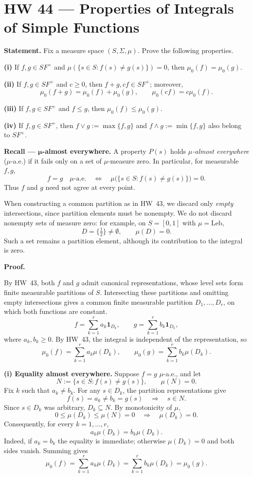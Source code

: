 \documentclass[10pt,a4paper]{article}
\begin{document}
\section*{\textcolor{PFFBlue}{HW 44 --- Properties of Integrals of Simple Functions}}

\textbf{Statement.} Fix a measure space $(S,\Sigma,\mu)$. Prove the following properties.

\textbf{(i)} If $f,g\in SF^+$ and $\mu(\{s\in S:f(s)\ne g(s)\})=0$, then $\mu_0(f)=\mu_0(g)$.

\textbf{(ii)} If $f,g\in SF^+$ and $c\ge0$, then $f+g,cf\in SF^+$; moreover,
\[
\mu_0(f+g)=\mu_0(f)+\mu_0(g),\qquad \mu_0(cf)=c\mu_0(f).
\]

\textbf{(iii)} If $f,g\in SF^+$ and $f\le g$, then $\mu_0(f)\le\mu_0(g)$.

\textbf{(iv)} If $f,g\in SF^+$, then $f\vee g:=\max\{f,g\}$ and $f\wedge g:=\min\{f,g\}$ also belong to $SF^+$.

\medskip
\textbf{Recall --- $\boldsymbol{\mu}$-almost everywhere.}
A property $P(s)$ holds \emph{$\mu$-almost everywhere} ($\mu$-a.e.) if it fails only on a set of $\mu$-measure zero. In particular, for measurable $f,g$,
\[
f=g\quad\mu\text{-a.e.}
\quad\Longleftrightarrow\quad
\mu\bigl(\{s\in S:f(s)\ne g(s)\}\bigr)=0.
\]
Thus $f$ and $g$ need not agree at every point.

When constructing a common partition as in HW~43, we discard only \emph{empty} intersections, since partition elements must be nonempty. We do not discard nonempty sets of measure zero: for example, on $S=[0,1]$ with $\mu=\mathrm{Leb}$,
\[
D=\{\tfrac12\}\ne\emptyset,\qquad \mu(D)=0.
\]
Such a set remains a partition element, although its contribution to the integral is zero.

\medskip
\textbf{\textcolor{PFFBlue}{Proof.}}

By HW~43, both $f$ and $g$ admit canonical representations, whose level sets form finite measurable partitions of $S$. Intersecting these partitions and omitting empty intersections gives a common finite measurable partition $D_1,\ldots,D_r$, on which both functions are constant.
\[
f=\sum_{k=1}^{r}a_k\mathbf1_{D_k},\qquad
 g=\sum_{k=1}^{r}b_k\mathbf1_{D_k},
\]
where $a_k,b_k\ge0$. By HW~43, the integral is independent of the representation, so
\[
\mu_0(f)=\sum_{k=1}^{r}a_k\mu(D_k),\qquad
\mu_0(g)=\sum_{k=1}^{r}b_k\mu(D_k).
\]

\textbf{(i) Equality almost everywhere.}
Suppose $f=g$ $\mu$-a.e., and let
\[
N:=\{s\in S:f(s)\ne g(s)\},\qquad \mu(N)=0.
\]
Fix $k$ such that $a_k\ne b_k$. For any $s\in D_k$, the partition representations give
\[
f(s)=a_k\ne b_k=g(s)\quad\Longrightarrow\quad s\in N.
\]
Since $s\in D_k$ was arbitrary, $D_k\subseteq N$. By monotonicity of $\mu$,
\[
0\le\mu(D_k)\le\mu(N)=0
\quad\Longrightarrow\quad \mu(D_k)=0.
\]
Consequently, for every $k=1,\ldots,r$,
\[
a_k\mu(D_k)=b_k\mu(D_k).
\]
Indeed, if $a_k=b_k$ the equality is immediate; otherwise $\mu(D_k)=0$ and both sides vanish. Summing gives
\[
\mu_0(f)=\sum_{k=1}^{r}a_k\mu(D_k)
=\sum_{k=1}^{r}b_k\mu(D_k)=\mu_0(g).
\]
\end{document}
